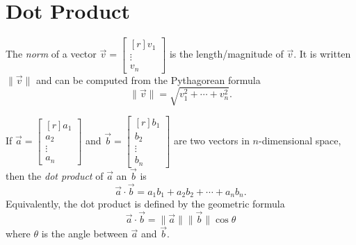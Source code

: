\documentclass{problemset}
\newcommand{\mat}[1]{\begin{bmatrix*}[r]#1\end{bmatrix*}}
\begin{document}
\newpage
\section*{Dot Product}
	\begin{definition}[Norm]
		The \emph{norm} of a vector $\vec v=\mat{v_1\\\vdots\\v_n}$ is the
		length/magnitude of $\vec v$. It is written $\|\vec v\|$ and can be computed from
		the Pythagorean formula
		\[
			\|\vec v\|=\sqrt{v_1^2+\cdots +v_n^2}.
		\]
	\end{definition}

	\begin{definition}
		If $\vec a=\mat{a_1\\a_2\\ \vdots\\a_n}$ and 
		$\vec b=\mat{b_1\\b_2\\ \vdots\\b_n}$ are two vectors in $n$-dimensional 
		space, then the \emph{dot product} of $\vec a$ an $\vec b$ is
		\[
			\vec a\cdot\vec b = a_1b_1+a_2b_2+\cdots+a_nb_n.
		\]
		Equivalently, the dot product is defined by the geometric formula
		\[
			\vec a\cdot \vec b = \|\vec a\|\|\vec b\|\cos \theta
		\]
		where $\theta$ is the angle between $\vec a$ and $\vec b$.
	\end{definition}
	
\end{document}
